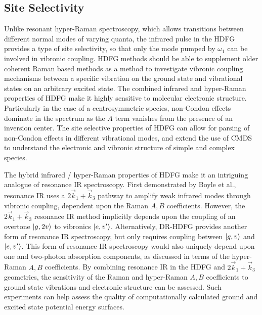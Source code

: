 \documentclass[aip, jcp, reprint, onecolumn]{revtex4-2}
\begin{document}
\subsection{Site Selectivity}
Unlike resonant hyper-Raman spectroscopy, which allows transitions between different normal modes of varying quanta, the infrared pulse in the HDFG provides a type of site selectivity,\cite{RN103, Carlson1991} so that only the mode pumped by $\omega_1$ can be involved in vibronic coupling.  
HDFG methods should be able to supplement older coherent Raman based methods as a method to investigate vibronic coupling mechanisms between a specific vibration on the ground state and vibrational states on an arbitrary excited state.\cite{RN103}
The combined infrared and hyper-Raman properties of HDFG make it highly sensitive to molecular electronic structure.
Particularly in the case of a centrosymmetric species, non-Condon effects dominate in the spectrum as the $A$ term vanishes from the presence of an inversion center.
The site selective properties of HDFG can allow for parsing of non-Condon effects in different vibrational modes, and extend the use of CMDS to understand the electronic and vibronic structure of simple and complex species.

The hybrid infrared / hyper-Raman properties of HDFG make it an intriguing analogue of resonance IR spectroscopy.
First demonstrated by Boyle et al., resonance IR uses a $2\vec{k}_1 + \vec{k}_3$ pathway to amplify weak infrared modes through vibronic coupling, dependent upon the Raman $A,B$ coefficients. \cite{RN491}
However, the $2\vec{k}_1 + \vec{k}_3$ resonance IR method implicitly depends upon the coupling of an overtone $\ket{g,2v}$ to vibronics $\ket{e,v'}$.
Alternatively, DR-HDFG provides another form of resonance IR spectroscopy, but only requires coupling between $\ket{g,v}$ and $\ket{e,v'}$.
This form of resonance IR spectroscopy would also uniquely depend upon one and two-photon absorption components, as discussed in terms of the hyper-Raman $A,B$ coefficients.
By combining resonance IR in the HDFG and $2\vec{k}_1 + \vec{k}_3$ geometries, the sensitivity of the Raman and hyper-Raman $A,B$ coefficients to ground state vibrations and electronic structure can be assessed. 
Such experiments can help assess the quality of computationally calculated ground and excited state potential energy surfaces. 
\end{document}
